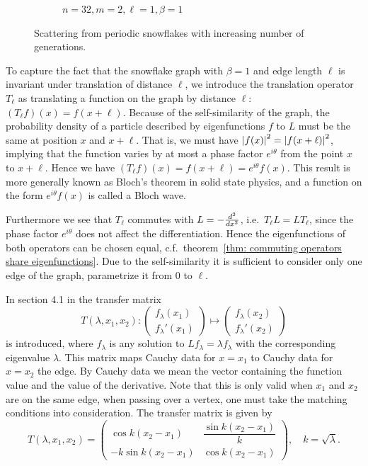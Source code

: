 \begin{figure}[!h]
\begin{subfigure}[t]{0.8\textwidth}
    \caption{$n=32, m=2, \ell=1, \beta=1$}
  \end{subfigure}
  \caption{Scattering from periodic snowflakes with increasing number of generations.}
  \label{fig: periodic snowflake reflection graphs}
\end{figure}
\clearpage

To capture the fact that the snowflake graph with $\beta=1$ and edge length $\ell$ is invariant under translation of distance $\ell$, we introduce the translation operator $T_\ell$ as translating a function on the graph by distance $\ell$: $(T_\ell f)(x) = f(x+\ell)$. Because of the self-similarity of the graph, the probability density of a particle described by eigenfunctions $f$ to $L$ must be the same at position $x$ and $x+\ell$. That is, we must have $\left\lvert f(x)\right\rvert^2 = \left\lvert f(x+\ell)\right\rvert^2$, implying that the function varies by at most a phase factor $e^{i\theta}$ from the point $x$ to $x+\ell$. Hence we have $(T_\ell f)(x) = f(x+\ell) = e^{i\theta} f(x)$. This result is more generally known as Bloch's theorem in solid state physics, and a function on the form $e^{i\theta} f(x)$ is called a Bloch wave.

Furthermore we see that $T_\ell$ commutes with $L = -\frac{d^2}{dx^2}$, i.e.\ $T_\ell L = LT_\ell$, since the phase factor $e^{i\theta}$ does not affect the differentiation. Hence the eigenfunctions of both operators can be chosen equal, c.f.\ theorem~\ref{thm: commuting operators share eigenfunctions}.
Due to the self-similarity it is sufficient to consider only one edge of the graph, parametrize it from $0$ to $\ell$.

In section 4.1 in \cite{pavel book} the transfer matrix
\[
  T(\lambda, x_1, x_2) :
  \begin{pmatrix}
    f_\lambda(x_1) \\
    f_\lambda'(x_1)
  \end{pmatrix}
  \mapsto
  \begin{pmatrix}
    f_\lambda(x_2) \\
    f_\lambda'(x_2)
  \end{pmatrix}
\]
is introduced, where $f_\lambda$ is any solution to $Lf_\lambda = \lambda f_\lambda$ with the corresponding eigenvalue $\lambda$. This matrix maps Cauchy data for $x=x_1$ to Cauchy data for $x=x_2$ the edge. By Cauchy data we mean the vector containing the function value and the value of the derivative. Note that this is only valid when $x_1$ and $x_2$ are on the same edge, when passing over a vertex, one must take the matching conditions into consideration. The transfer matrix is given by
\[
  T(\lambda, x_1, x_2) =
  \begin{pmatrix}
    \cos k(x_2-x_1) & \dfrac{\sin k(x_2-x_1)}{k} \\
    -k \sin k(x_2-x_1) & \cos k(x_2-x_1)
  \end{pmatrix}, \quad k = \sqrt{\lambda}.
\]

